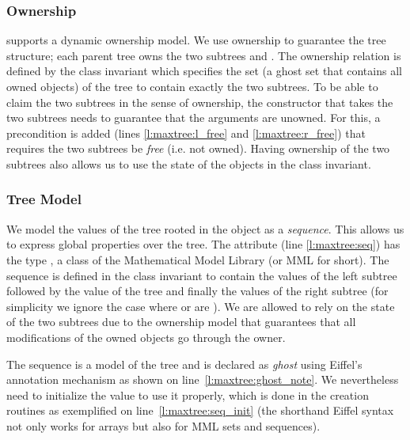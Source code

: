 \subsubsection{Ownership}

\AutoProof supports a dynamic ownership model. 
We use ownership to guarantee the tree structure; each parent tree owns the two subtrees  and . The ownership relation is defined by the  class invariant which specifies the  set (a ghost set that contains all owned objects) of the tree to contain exactly the two subtrees. To be able to claim the two subtrees in the sense of ownership, the constructor that takes the two subtrees needs to guarantee that the arguments are unowned. For this, a precondition is added (lines \ref{l:maxtree:l_free} and \ref{l:maxtree:r_free}) that requires the two subtrees be \emph{free} (i.e. not owned). Having ownership of the two subtrees also allows us to use the state of the objects in the class invariant.

\subsubsection{Tree Model}

We model the values of the tree rooted in the  object as a \emph{sequence}. This allows us to express global properties over the tree. The  attribute (line \ref{l:maxtree:seq}) has the type , a class of the Mathematical Model Library (or MML for short).
The sequence is defined in the class invariant  to contain the values of the left subtree followed by the value of the  tree and finally the values of the right subtree (for simplicity we ignore the case where  or  are ).
We are allowed to rely on the state of the two subtrees due to the ownership model that guarantees that all modifications of the owned objects go through the owner.

The sequence is a model of the tree and is declared as \emph{ghost} using Eiffel's annotation mechanism as shown on line~\ref{l:maxtree:ghost_note}. We nevertheless need to initialize the value to use it properly, which is done in the creation routines as exemplified on line~\ref{l:maxtree:seq_init} (the shorthand Eiffel syntax  not only works for arrays but also for MML sets and sequences).



